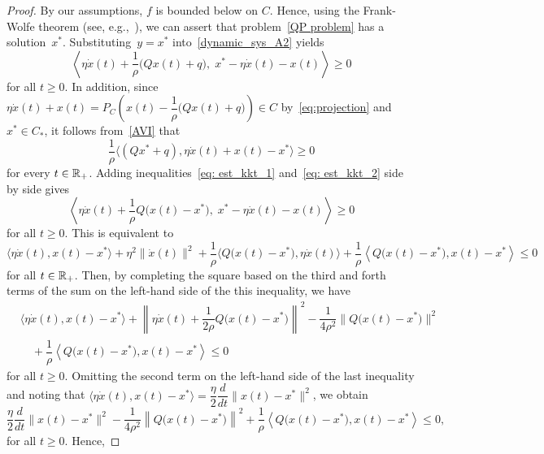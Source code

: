 \documentclass[11pt]{article}
\theoremstyle{definition}
\theoremstyle{remark}
\def\R{\Bbb R}
\begin{document}
\begin{proof}
	 By our assumptions, $f$ is bounded below on $C$. Hence, using the Frank-Wolfe theorem (see, e.g.,~\cite[Theorem~2.1]{lty05}), we can assert that problem~\eqref{QP problem} has a solution~$x^*$. Substituting~$y=x^*$ into~\eqref{dynamic_sys_A2} yields
\begin{equation}\label{eq: est_kkt_1}
	\left\langle \eta \dot{x}(t) + \dfrac{1}{\rho}\big(Q x(t)+ q\big),\; x^*-\eta\dot{x}(t) -x (t)  \right\rangle \geq 0
\end{equation} for all $t\geq 0$. 
In addition, since $\eta\dot{x}(t) +x(t)=P_C\left(x(t)-\dfrac{1}{\rho}\big(Q x(t)+q\big)\right)\in C$ by~\eqref{eq:projection} and~$x^*\in C_*$, it follows from~\eqref{AVI} that
\begin{equation}\label{eq: est_kkt_2}
\dfrac{1}{\rho}\big\langle(Qx^*+ q), \eta\dot{x}(t) +x(t) - x^*\big\rangle \geq 0
\end{equation} 
 for every $t\in\R_+$. Adding inequalities~\eqref{eq: est_kkt_1} and~\eqref{eq: est_kkt_2} side by side gives
 $$\left\langle \eta \dot{x}(t) + \dfrac{1}{\rho}Q\big(x(t)-x^*\big),\; x^*-\eta\dot{x}(t) -x (t)  \right\rangle \geq 0$$
 for all $t\geq 0$. This is equivalent to
 $$\langle \eta \dot{x}(t),x(t)-x^*\rangle +\eta^2\|\dot{x}(t)\|^2+\dfrac{1}{\rho}\langle Q\big(x(t)-x^*\big),\eta \dot{x}(t)\rangle +\dfrac{1}{\rho}\left\langle Q\big( x(t)-x^*\big), x(t)-x^*\right\rangle\leq 0$$
 for all $t\in\R_+$.
 Then, by completing the square based on the third and forth terms of the sum on the left-hand side of the this inequality, we have
 $$\begin{array}{ll}
 &\langle \eta \dot{x}(t),x(t)-x^*\rangle + \left\|\eta \dot{x}(t) +\dfrac{1}{2\rho}Q\big(x(t)-x^*\big)\right\|^2-\dfrac{1}{4\rho^2}\|Q\big(x(t)-x^*\big)\|^2 \\
 &\quad+\dfrac{1}{\rho}\left\langle Q\big(x(t)-x^*\big), x(t)-x^*\right\rangle\leq 0
 \end{array}$$ 
 for all $t\geq 0$. Omitting the second term on the left-hand side of the last inequality and noting that $\langle \eta \dot{x}(t),x(t)-x^*\rangle= \dfrac{\eta}{2}\dfrac{d}{dt}\|x(t)-x^*\|^2$, we obtain
 \begin{equation*}
 	\dfrac{\eta}{2}\dfrac{d}{dt}\|x(t)-x^*\|^2 -\dfrac{1}{4\rho^2}\left\|Q\big(x(t)-x^*\big)\right\|^2  +\dfrac{1}{\rho}\left\langle Q\big(x(t)-x^*\big), x(t)-x^*\right\rangle\leq 0,
 \end{equation*}
 for all $t\geq 0$. Hence,
 

\end{proof}
\end{document}
